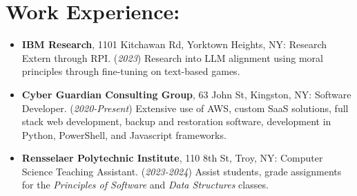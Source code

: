 \documentclass[12pt]{article}
\begin{document}
\section*{Work Experience:}
\begin{itemize}
    \itemsep0em 
    \item \textbf{IBM Research}, 1101 Kitchawan Rd, Yorktown Heights, NY: Research Extern through RPI. (\textit{2023}) Research into LLM alignment using moral principles through fine-tuning on text-based games.
    
    \item \textbf{Cyber Guardian Consulting Group}, 63 John St, Kingston, NY: Software Developer. (\textit{2020-Present}) Extensive use of AWS, custom SaaS solutions, full stack web development, backup and restoration software, development in Python, PowerShell, and Javascript frameworks.
    
    \item \textbf{Rensselaer Polytechnic Institute}, 110 8th St, Troy, NY: Computer Science Teaching Assistant. (\textit{2023-2024}) Assist students, grade assignments for the \textit{Principles of Software} and \textit{Data Structures} classes.
\end{itemize}
\end{document}
